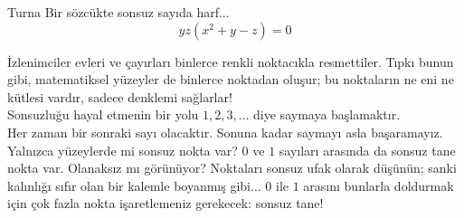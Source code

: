 \begin{surferPage}{Turna}
Bir sözcükte sonsuz sayıda harf...\\
\smallskip
\[y z (x^2	+ y - z)	= 0\]

\vspace{0.3cm}
İzlenimciler evleri ve çayırları binlerce renkli noktacıkla resmettiler. Tıpkı bunun gibi, matematiksel yüzeyler de binlerce noktadan oluşur; bu noktaların ne eni ne kütlesi vardır, sadece denklemi sağlarlar! \\
\vspace{0.3cm}
Sonsuzluğu hayal etmenin bir yolu $1, 2, 3, \dots$ diye saymaya başlamaktır.\\
Her zaman bir sonraki sayı olacaktır. Sonuna kadar saymayı asla başaramayız.\\
\vspace{0.3cm}
Yalnızca yüzeylerde mi sonsuz nokta var? $0$ ve $1$ sayıları arasında da sonsuz tane nokta var. Olanaksız mı görünüyor? Noktaları sonsuz ufak olarak düşünün; sanki kalınlığı sıfır olan bir kalemle boyanmış gibi... $0$ ile $1$ arasını bunlarla doldurmak için çok fazla nokta işaretlemeniz gerekecek: sonsuz tane!
\end{surferPage}
